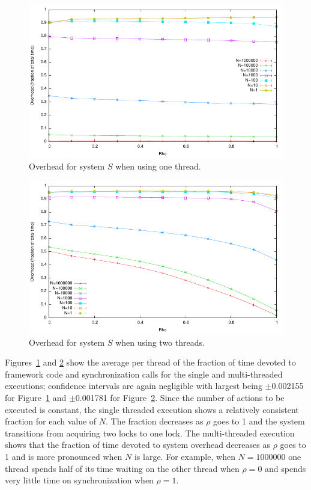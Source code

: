 \begin{figure}
\center
\includegraphics[width=\columnwidth]{overhead1}
\caption{Overhead for system $S$ when using one thread.\label{overhead1}}
\end{figure}

\begin{figure}
\center
\includegraphics[width=\columnwidth]{overhead2}
\caption{Overhead for system $S$ when using two threads.\label{overhead2}}
\end{figure}

Figures~\ref{overhead1} and \ref{overhead2} show the average per thread of the fraction of time devoted to framework code and synchronization calls for the single and multi-threaded executions; confidence intervals are again negligible with largest being $\pm$0.002155 for Figure~\ref{overhead1} and $\pm$0.001781 for Figure~\ref{overhead2}.
Since the number of actions to be executed is constant, the single threaded execution shows a relatively consistent fraction for each value of $N$.
The fraction decreases as $\rho$ goes to 1 and the system transitions from acquiring two locks to one lock.
The multi-threaded execution shows that the fraction of time devoted to system overhead decreases as $\rho$ goes to 1 and is more pronounced when $N$ is large.
For example, when $N=1000000$ one thread spends half of its time waiting on the other thread when $\rho = 0$ and spends very little time on synchronization when $\rho = 1$.

